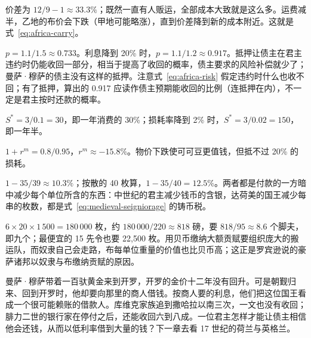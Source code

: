 \begin{answers}
\item 价差为 $12/9-1\approx33.3\%$；既然一直有人贩运，全部成本大致就是这么多。运费减半，乙地的布价会下跌（甲地可能略涨），直到价差降到新的成本附近。这就是式~\eqref{eq:africa-carry}。
\item $p=1.1/1.5\approx0.733$。利息降到 20\% 时，$p=1.1/1.2\approx0.917$。抵押让债主在君主违约时仍能收回一部分，相当于提高了收回的概率，债主要求的风险补偿就少了；曼萨·穆萨的债主没有这样的抵押。注意式~\eqref{eq:africa-risk} 假定违约时什么也收不回；有了抵押，算出的 0.917 应读作债主预期能收回的比例（连抵押在内），不一定是君主按时还款的概率。
\item $S^{*}=3/0.1=30$，即一年消费的 30\%；损耗率降到 2\% 时，$S^{*}=3/0.02=150$，即一年半。
\item $1+r^{m}=0.8/0.95$，$r^{m}\approx-15.8\%$。物价下跌使可可豆更值钱，但抵不过 20\% 的损耗。
\item $1-35/39\approx10.3\%$；按散的 40 枚算，$1-35/40=12.5\%$。两者都是付款的一方暗中减少每个单位所含的东西：中世纪的君主减少钱币的含银，达荷美的国王减少每串的枚数，都是式~\eqref{eq:medieval-seigniorage} 的铸币税。
\item $6\times20\times1\,500=180\,000$ 枚，约 $180\,000/220\approx818$ 磅，要 $818/95\approx8.6$ 个脚夫，即九个；最便宜的 15 先令也要 22,500 枚。用贝币缴纳大额贡赋要组织庞大的搬运队，而奴隶自己会走路，布每单位重量的价值也比贝币高；这正是罗宾逊说的豪萨诸邦以奴隶与布缴纳贡赋的原因。
\end{answers}

曼萨·穆萨带着一百驮黄金来到开罗，开罗的金价十二年没有回升。可是朝觐归来、回到开罗时，他却要向那里的商人借钱。按商人要的利息，他们把这位国王看成一个很可能赖账的借款人。库维克家族追到撒哈拉以南三次，一文也没有收回；腓力二世的银行家在停付之后，还能收回六到八成。一位君主怎样才能让债主相信他会还钱，从而以低利率借到大量的钱？下一章去看 17 世纪的荷兰与英格兰。
